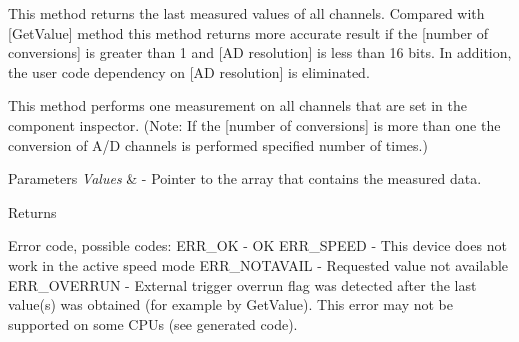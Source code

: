 This method returns the last measured values of all channels. Compared with \mbox{[}Get\+Value\mbox{]} method this method returns more accurate result if the \mbox{[}number of conversions\mbox{]} is greater than 1 and \mbox{[}AD resolution\mbox{]} is less than 16 bits. In addition, the user code dependency on \mbox{[}AD resolution\mbox{]} is eliminated. 

This method performs one measurement on all channels that are set in the component inspector. (Note\+: If the \mbox{[}number of conversions\mbox{]} is more than one the conversion of A/D channels is performed specified number of times.)


\begin{DoxyParams}{Parameters}
{\em Values} & -\/ Pointer to the array that contains the measured data. \\
\hline
\end{DoxyParams}
\begin{DoxyReturn}{Returns}

\begin{DoxyItemize}
\item Error code, possible codes\+: E\+R\+R\+\_\+\+OK -\/ OK E\+R\+R\+\_\+\+S\+P\+E\+ED -\/ This device does not work in the active speed mode E\+R\+R\+\_\+\+N\+O\+T\+A\+V\+A\+IL -\/ Requested value not available E\+R\+R\+\_\+\+O\+V\+E\+R\+R\+UN -\/ External trigger overrun flag was detected after the last value(s) was obtained (for example by Get\+Value). This error may not be supported on some C\+P\+Us (see generated code).
\end{DoxyItemize}
\end{DoxyReturn}

